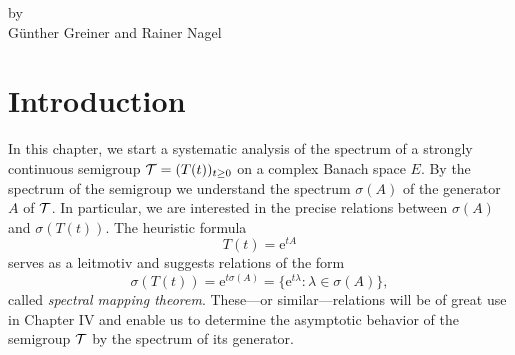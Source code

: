 \label{chap:a3}%
{\Large
\vspace*{-.75cm}
by \\[.25em]
Günther Greiner and Rainer Nagel 
\vspace{.75cm}
\\
}
\section{Introduction}%
In this chapter, we start a systematic analysis of the spectrum of a strongly continuous semigroup $\mathcal{T} = (T(t))_{t\geq 0}$ on a complex Banach space $E$.
By the spectrum of the semigroup we understand the spectrum $\sigma(A)$ of the generator $A$ of $\mathcal{T}$.
In particular, we are interested in the precise relations between $\sigma(A)$ and $\sigma(T(t))$.
The heuristic formula
\[
	T(t) = \mathrm{e}^{tA}
\]
serves as a leitmotiv and suggests relations of the form
\[
\sigma(T(t)) = \mathrm{e}^{t\sigma(A)} = \{ \mathrm{e}^{t\lambda} \colon \lambda \in \sigma(A) \} ,
\]
called \emph{spectral mapping theorem}.
These---or similar---relations will be of great use in Chapter IV and enable us to determine the asymptotic behavior of the semigroup $\mathcal{T}$ by the spectrum of its generator.

